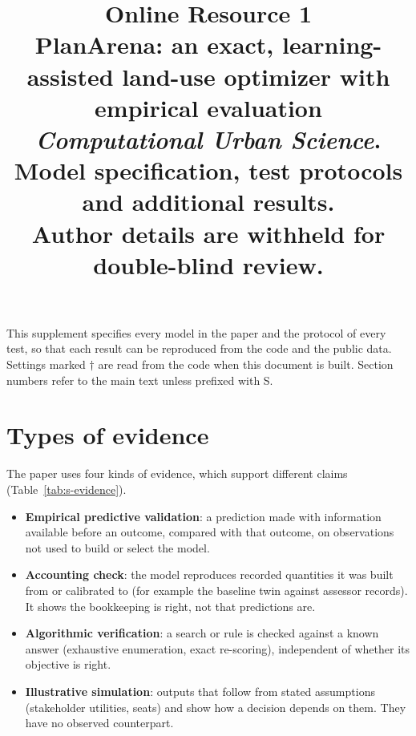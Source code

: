 \documentclass[10pt]{article}
\title{\large\textbf{Online Resource 1}\\[0.3em]
\normalsize PlanArena: an exact, learning-assisted land-use optimizer with empirical evaluation\\
\small \textit{Computational Urban Science}. Model specification, test protocols and additional results.\\
Author details are withheld for double-blind review.}
\author{}
\date{}
\begin{document}
\maketitle
\vspace{-3em}

\noindent This supplement specifies every model in the paper and the protocol of every test, so that each result can
be reproduced from the code and the public data. Settings marked $\dagger$ are read from the code when this document is
built. Section numbers refer to the main text unless prefixed with S.

\section{Types of evidence}\label{s:evidence}

The paper uses four kinds of evidence, which support different claims (Table~\ref{tab:s-evidence}).
\begin{itemize}
\item \textbf{Empirical predictive validation}: a prediction made with information available before an outcome,
compared with that outcome, on observations not used to build or select the model.
\item \textbf{Accounting check}: the model reproduces recorded quantities it was built from or calibrated to (for
example the baseline twin against assessor records). It shows the bookkeeping is right, not that predictions are.
\item \textbf{Algorithmic verification}: a search or rule is checked against a known answer (exhaustive enumeration,
exact re-scoring), independent of whether its objective is right.
\item \textbf{Illustrative simulation}: outputs that follow from stated assumptions (stakeholder utilities, seats) and
show how a decision depends on them. They have no observed counterpart.
\end{itemize}
\end{document}
